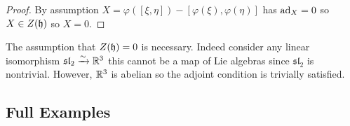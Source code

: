 \documentclass[12pt]{extarticle}
\begin{document}
\begin{proof}
By assumption $X = \varphi([\xi, \eta]) - [\varphi(\xi), \varphi(\eta)]$ has $\mathrm{ad}_X = 0$ so $X \in Z(\mathfrak{h})$ so $X = 0$.
\end{proof}

\begin{rmk}
The assumption that $Z(\mathfrak{h}) = 0$ is necessary. Indeed consider any linear isomorphism $\mathfrak{sl}_2 \xrightarrow{\sim} \mathbb{R}^3$ this cannot be a map of Lie algebras since $\mathfrak{sl}_2$ is nontrivial. However, $\mathbb{R}^3$ is abelian so the adjoint condition is trivially satisfied.
\end{rmk}

\subsection{Full Examples}

\newcommand{\SL}{\mathrm{SL}}
\renewcommand{\sl}{\mathfrak{sl}}
\end{document}
